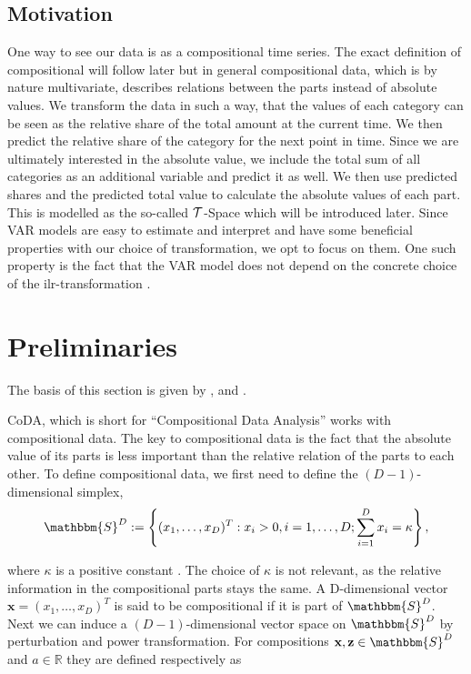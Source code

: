 \subsection{Motivation}
\label{sec: Coda Motivation}

One way to see our data is as a compositional time series. The exact definition of compositional will follow later but in general compositional data, which is by nature multivariate, describes relations between the parts instead of absolute values. We transform the data in such a way, that the values of each category can be seen as the relative share of the total amount at the current time. We then predict the relative share of the category for the next point in time. Since we are ultimately interested in the absolute value, we include the total sum of all categories as an additional variable and predict it as well. We then use predicted shares and the predicted total value to calculate the absolute values of each part. This is modelled as the so-called $\mathcal{T}$-Space which will be introduced later. Since VAR models are easy to estimate and interpret and have some beneficial properties with our choice of transformation, we opt to focus on them. One such property is the fact that the VAR model does not depend on the concrete choice of the ilr-transformation \cite{Kynclova:2015}. 


\section{Preliminaries}
\label{sec: Coda Preliminaries}
The basis of this section is given by \cite{Kynclova:2015}, \cite{Egozcue:2003} and \cite{Filzmoser:2020}.

CoDA, which is short for "`Compositional Data Analysis"' works with compositional data. The key to compositional data is the fact that the absolute value of its parts is less important than the relative relation of the parts to each other. To define compositional data, we first need to define the $(D-1)$-dimensional simplex,
	\begin{equation}
	\mathbbm{S}^D := \left\{(x_1,\ldots, x_D)^T: x_i > 0, i =1,\ldots,D; \sum_{i=1}^{D}x_i=\kappa  \right\},
	\label{eq:Simplex Definition}
	\end{equation}
	
where $\kappa$ is a positive constant \cite{Kynclova:2015}. The choice of $\kappa$ is not relevant, as the relative information in the compositional parts stays the same.  A D-dimensional vector $\textbf{x} = (x_1,\ldots,x_D)^T$ is said to be compositional if it is part of $\mathbbm{S}^D$. Next we can induce a $(D-1)$-dimensional vector space on $\mathbbm{S}^D$ by perturbation and power transformation. For compositions $\textbf{x},\textbf{z} \in \mathbbm{S}^D$ and $a \in \mathbb{R}$ they are defined respectively as \cite{Kynclova:2015}

